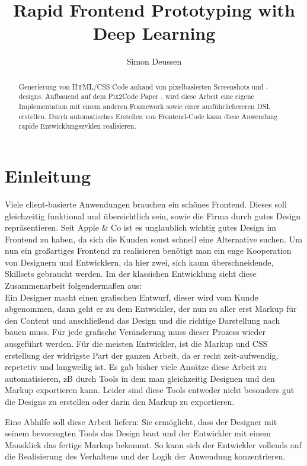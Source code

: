 \documentclass[pdftex,a4paper,halfparskip]{scrartcl}
\title{Rapid Frontend Prototyping with Deep Learning} %
\author{Simon Deussen}	%
\begin{document}
\maketitle	

\begin{abstract}
Generierung von HTML/CSS Code anhand von pixelbasierten Screenshots und -designs. Aufbauend auf dem Pix2Code Paper \cite{Beltramelli17}, wird diese Arbeit eine eigene Implementation mit einem anderen Framework sowie einer ausführlichereren DSL erstellen. Durch automatisches Erstellen von Frontend-Code kann diese Anwendung rapide Entwicklungszyklen realisieren.
\end{abstract}


\tableofcontents	%
\section{Einleitung} 

Viele client-basierte Anwendungen brauchen ein schönes Frontend. Dieses soll gleichzeitig funktional und übersichtlich sein, sowie die Firma durch gutes Design repräsentieren. Seit Apple \& Co ist es unglaublich wichtig gutes Design im Frontend zu haben, da sich die Kunden sonst schnell eine Alternative suchen. Um nun ein großartiges Frontend zu realisieren benötigt man ein enge Kooperation von Designern und Entwicklern, da hier zwei, sich kaum überschneidende, Skillsets gebraucht werden. Im der klassichen Entwicklung sieht diese Zusammenarbeit folgendermaßen aus: \\
Ein Designer macht einen grafischen Entwurf, dieser wird vom Kunde abgenommen, dann geht er zu dem Entwickler, der nun zu aller erst Markup für den Content und anschließend das Design und die richtige Darstellung nach bauen muss. Für jede grafische Veränderung muss dieser Prozess wieder ausgeführt werden. Für die meisten Entwickler, ist die Markup und CSS erstellung der widrigste Part der ganzen Arbeit, da er recht zeit-aufwendig, repetetiv und langweilig ist. Es gab bisher viele Ansätze diese Arbeit zu automatisieren, zB durch Tools in dem man gleichzeitig Designen und den Markup exportieren kann. Leider sind diese Tools entweder nicht besonders gut die Designs zu erstellen oder darin den Markup zu exportieren.

Eine Abhilfe soll diese Arbeit liefern: Sie ermöglicht, dass der Designer mit seinem bevorzugten Tools das Design baut und der Entwickler mit einem Mausklick das fertige Markup bekommt. So kann sich der Entwickler vollends auf die Realisierung des Verhaltens und der Logik der Anwendung konzentrieren. 
\end{document}
